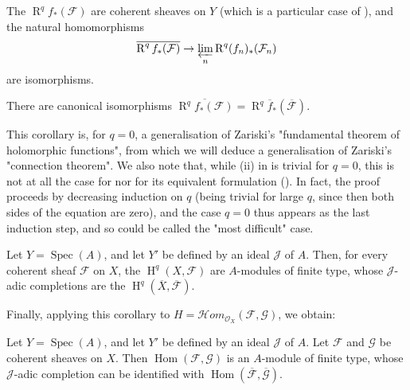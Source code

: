 \begin{theorem}\label{fga2-theorem-2}
    The $\operatorname{R}^q f_*(\mathcal{F})$ are coherent sheaves on $Y$ (which is a particular case of ), and the natural homomorphisms
    \[\overline{\operatorname{R}^q f_*(\mathcal{F})} \to \varprojlim_n \operatorname{R}^q (f_n)_*(\mathcal{F}_n)\]
    are isomorphisms.
\end{theorem}

\begin{corollary}\label{fga2-theorem-2-corollary-1}
    There are canonical isomorphisms $\overline{\operatorname{R}^q f_*(\mathcal{F})} = \operatorname{R}^q\overline{f}_*(\overline{\mathcal{F}})$.
\end{corollary}


This corollary is, for $q=0$, a generalisation of Zariski's "fundamental theorem of holomorphic functions", from which we will deduce a generalisation of Zariski's "connection theorem".
We also note that, while (ii) in  is trivial for $q=0$, this is not at all the case for  nor for its equivalent formulation ().
In fact, the proof proceeds by decreasing induction on $q$ (being trivial for large $q$, since then both sides of the equation are zero), and the case $q=0$ thus appears as the last induction step, and so could be called the "most difficult" case.

\begin{corollary}\label{fga2-theorem-2-corollary-2}
    Let $Y=\operatorname{Spec}(A)$, and let $Y'$ be defined by an ideal $\mathcal{J}$ of $A$.
    Then, for every coherent sheaf $\mathcal{F}$ on $X$, the $\operatorname{H}^q(X,\mathcal{F})$ are $A$-modules of finite type, whose $\mathcal{J}$-adic completions are the $\operatorname{H}^q(\overline{X},\overline{\mathcal{F}})$.
\end{corollary}

Finally, applying this corollary to $H=\mathcal{H}om_{\mathcal{O}_X}(\mathcal{F},\mathcal{G})$, we obtain:

\begin{corollary}\label{fga2-theorem-2-corollary-3}
    Let $Y=\operatorname{Spec}(A)$, and let $Y'$ be defined by an ideal $\mathcal{J}$ of $A$.
    Let $\mathcal{F}$ and $\mathcal{G}$ be coherent sheaves on $X$.
    Then $\operatorname{Hom}(\mathcal{F},\mathcal{G})$ is an $A$-module of finite type, whose $\mathcal{J}$-adic completion can be identified with $\operatorname{Hom}(\overline{\mathcal{F}},\overline{\mathcal{G}})$.
\end{corollary}

